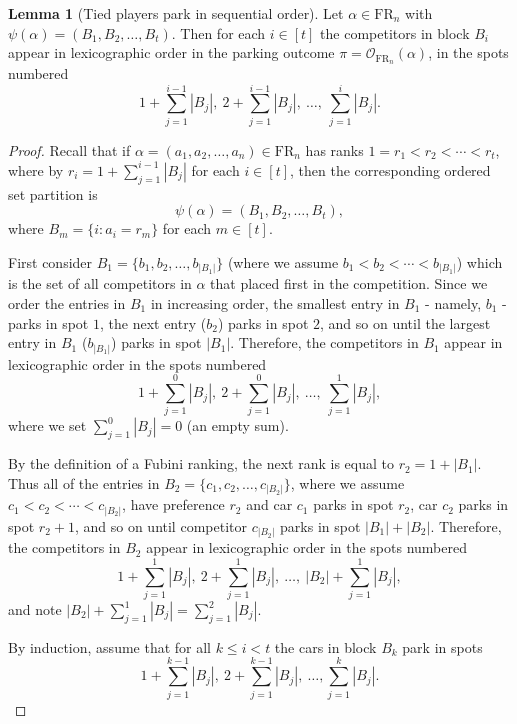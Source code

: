 \documentclass{amsart}
\theoremstyle{definition}
\newtheorem{lemma}{Lemma}[section]
\theoremstyle{definition}
\theoremstyle{remark}
\newcommand{\FR}[1]{\mathrm{FR}_{#1}}
\newcommand{\out}{\mathcal{O}}
\begin{document}
\begin{lemma}[Tied players park in sequential order]\label{lemma: competitor outcome for ties}
    Let $\alpha\in\FR{n}$ with $\psi(\alpha)=(B_1,B_2,\ldots,B_t)$.
    Then for each $i\in[t]$ the competitors in block $B_i$ appear in lexicographic order in the parking outcome $\pi = \out_{\FR{n}}(\alpha)$, in the spots numbered \[1+\sum_{j=1}^{i-1}|B_j|,~2+\sum_{j=1}^{i-1}|B_j|,~\ldots,~ \sum_{j=1}^{i}|B_j|. \]
\end{lemma}
\begin{proof}
    Recall that if $\alpha=(a_1,a_2,\ldots,a_n)\in\FR{n}$ has ranks $1=r_1<r_2<\cdots<r_t$, where by  $r_i=1+\sum_{j=1}^{i-1}|B_j|$ for each $i\in[t]$, then the corresponding ordered set partition is
    \[\psi(\alpha)=(B_1,B_2,\ldots,B_t),\]
    where $B_m=\{i:a_i=r_m\}$ for each $m\in[t]$.
    
    First consider $B_1=\{b_1,b_2,\ldots,b_{|B_1|}\}$
    (where we assume $b_1<b_2<\cdots<b_{|B_1|}$)
    which is the set of all competitors in $\alpha$ that placed first in the competition. 
    Since we order the entries in $B_1$ in increasing order,  the smallest entry in $B_1$ - namely, $b_1$ - parks in spot $1$, the next entry ($b_2$) parks in spot $2$, and so on until the largest entry in $B_1$ ($b_{|B_1|}$) parks in spot $|B_1|$.
    Therefore, the competitors in $B_1$ appear in lexicographic order in the spots numbered
    \[1 + \sum_{j=1}^0 |B_j|,~2 + \sum_{j=1}^0 |B_j|,~\ldots,~\sum_{j=1}^1 |B_j|, \]
    where we set $\sum_{j=1}^0|B_j|=0$ (an empty sum).
    
    
    By the definition of a Fubini ranking, the next rank is equal to $r_2=1+|B_1|$. 
    Thus all of the entries in $B_2=\{c_1,c_2,\ldots,c_{|B_2|}\}$, where we assume $c_1<c_2<\cdots<c_{|B_2|}$,  have  preference $r_2$ and 
car $c_1$ parks in spot $r_2$, car $c_2$ parks in spot $r_2+1$, and so on until competitor $c_{|B_2|}$ parks in spot $|B_1|+|B_2|$.
Therefore, the competitors in $B_2$ appear in lexicographic order in the spots numbered 
    \[1 + \sum_{j=1}^1 |B_j|,~2 + \sum_{j=1}^1 |B_j|,~\ldots,~|B_2| + \sum_{j=1}^{1}|B_j|, 
    \]
    and note $|B_2| + \sum_{j=1}^{1}|B_j|= \sum_{j=1}^2 |B_j|$.

By induction, assume that for all $k\leq i<t$ the cars in block $B_k$ park in spots 
\[1 + \sum_{j=1}^{k-1} |B_j|,~2 + \sum_{j=1}^{k-1} |B_j|,~\ldots, \sum_{j=1}^{k}|B_j|.\]


\end{proof}
\end{document}
